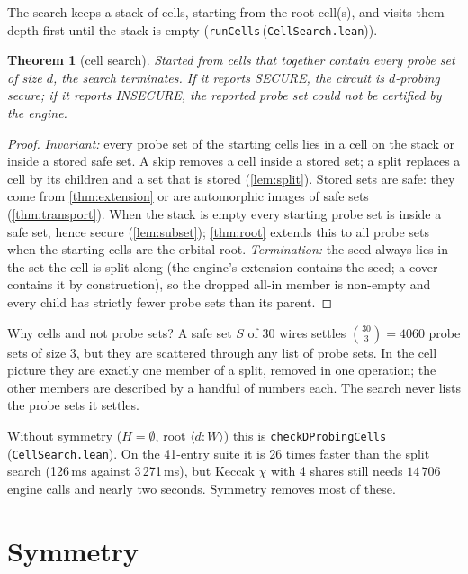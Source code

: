 \documentclass[11pt,a4paper]{article}
\newtheorem{theorem}{Theorem}[section]
\theoremstyle{definition}
\theoremstyle{remark}
\newcommand{\code}[1]{\texttt{\small #1}}
\newcommand{\lean}[2]{\code{#1}\,(\code{#2})}
\newcommand{\cellof}[2]{\langle #1 \mathbin{:} #2\rangle}
\begin{document}
The search keeps a stack of cells, starting from the root cell(s), and visits them
depth-first until the stack is empty (\lean{runCells}{CellSearch.lean}).

\begin{theorem}[cell search]\label{thm:cells}
Started from cells that together contain every probe set of size $d$, the search
terminates.  If it reports SECURE, the circuit is $d$-probing secure; if it reports
INSECURE, the reported probe set could not be certified by the engine.
\end{theorem}
\begin{proof}
\emph{Invariant:} every probe set of the starting cells lies in a cell on the stack or
inside a stored safe set.  A skip removes a cell inside a stored set; a split replaces a
cell by its children and a set that is stored (\cref{lem:split}).  Stored sets are safe:
they come from \cref{thm:extension} or are automorphic images of safe sets
(\cref{thm:transport}).  When the stack is empty every starting probe set is inside a safe
set, hence secure (\cref{lem:subset}); \cref{thm:root} extends this to all probe sets when
the starting cells are the orbital root.
\emph{Termination:} the seed always lies in the set the cell is split along (the engine's
extension contains the seed; a cover contains it by construction), so the dropped all-in
member is non-empty and every child has strictly fewer probe sets than its parent.
\end{proof}

\begin{intuition}
Why cells and not probe sets?  A safe set $S$ of 30 wires settles $\binom{30}{3}=4060$
probe sets of size 3, but they are scattered through any list of probe sets.  In the cell
picture they are exactly one member of a split, removed in one operation; the other members
are described by a handful of numbers each.  The search never lists the probe sets it
settles.
\end{intuition}

Without symmetry ($H=\emptyset$, root $\cellof{d}{W}$) this is
\lean{checkDProbingCells}{CellSearch.lean}.  On the 41-entry suite it is 26 times faster than
the split search (126\,ms against 3\,271\,ms), but Keccak $\chi$ with 4 shares still needs
$14\,706$ engine calls and nearly two seconds.  Symmetry removes most of these.

\section{Symmetry}\label{sec:symmetry}
\end{document}
